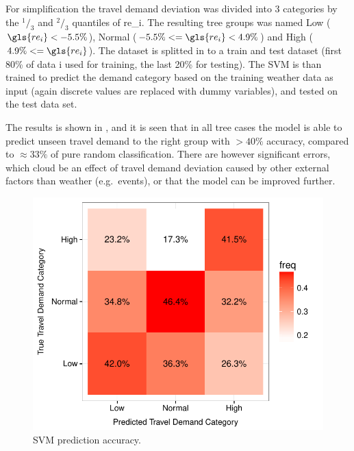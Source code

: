 For simplification the travel demand deviation was divided into 3 categories by the $^1/_3$ and $^2/_3$ quantiles of \gls{re_i}. The resulting tree groups was named Low ($\gls{re_i} < -5.5\%$), Normal ($-5.5\% <= \gls{re_i} < 4.9\%$) and High ($4.9\% <= \gls{re_i}$). The dataset is splitted in to a train and test dataset (first 80\% of data i used for training, the last 20\% for testing). The SVM is than trained to predict the demand category based on the training weather data as input (again discrete values are replaced with dummy variables), and tested on the test data set.

The results is shown in , and it is seen that in all tree cases the model is able to predict unseen travel demand to the right group with $>40\%$ accuracy, compared to $\approx33\%$ of pure random classification. There are however significant errors, which cloud be an effect of travel demand deviation caused by other external factors than weather (e.g.\ events), or that the model can be improved further.

\begin{figure}[!ht]
    \center
    \includegraphics{../plots/svm_prediction}
    \caption{SVM prediction accuracy.}
    \label{fig:svm_prediction}
\end{figure}